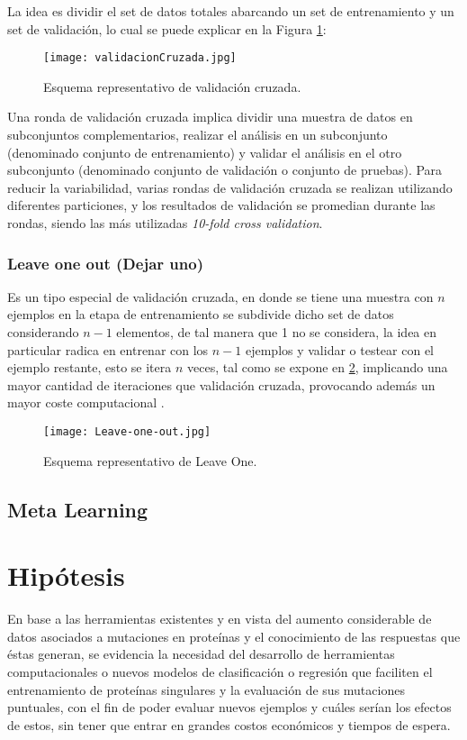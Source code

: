 La idea es dividir el set de datos totales abarcando un set de entrenamiento y un set de validación, lo cual se puede explicar en la Figura  \ref{VC}:

\begin{figure}[!h]
	\centering
	\texttt{[image: validacionCruzada.jpg]}
	\caption{Esquema representativo de validación cruzada.}
	\label{VC}
\end{figure}

Una ronda de validación cruzada implica dividir una muestra de datos en subconjuntos complementarios, realizar el análisis en un subconjunto (denominado conjunto de entrenamiento) y
validar el análisis en el otro subconjunto (denominado conjunto de validación o conjunto de pruebas). Para reducir la variabilidad, varias rondas de validación cruzada se realizan utilizando diferentes particiones, y los resultados de validación se promedian durante las rondas, siendo las más utilizadas \textit{10-fold cross validation}.

\subsubsection{Leave one out (Dejar uno)}

Es un tipo especial de validación cruzada, en donde se tiene una muestra con $n$ ejemplos en la etapa de entrenamiento se subdivide dicho set de datos considerando $n-1$ elementos, de tal manera que 1 no se considera, la idea en particular radica en entrenar con los $n-1$ ejemplos y validar o testear con el ejemplo restante, esto se itera $n$ veces, tal como se expone en \ref{LOO}, implicando una mayor cantidad de iteraciones que validación cruzada, provocando además un mayor coste computacional \cite{kohavi1995study}.

\begin{figure}[!h]
	\centering
	\texttt{[image: Leave-one-out.jpg]}
	\caption{Esquema representativo de Leave One.}
	\label{LOO}
\end{figure}


\subsection{Meta Learning}


\section{Hipótesis}

En base a las herramientas existentes y en vista del aumento considerable de datos asociados a mutaciones en proteínas y el conocimiento de las respuestas que éstas generan, se evidencia la necesidad del desarrollo de herramientas computacionales o nuevos modelos de clasificación o regresión que faciliten el entrenamiento de proteínas singulares y la evaluación de sus mutaciones puntuales, con el fin de poder evaluar nuevos ejemplos y cuáles serían los efectos de estos, sin tener que entrar en grandes costos económicos y tiempos de espera. 

